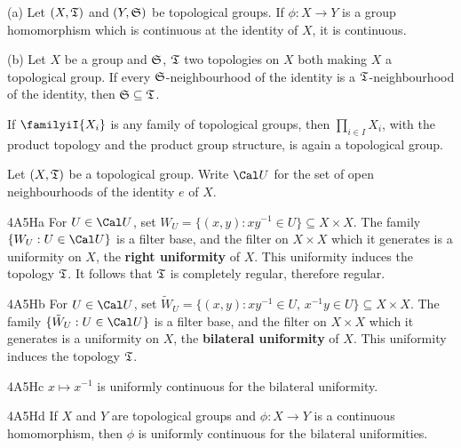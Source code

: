  (a) Let $(X,\frak T)$ and $(Y,\frak S)$ be
topological groups.   If $\phi:X\to Y$ is a group homomorphism which is
continuous at the identity of $X$, it is continuous.

(b) Let $X$ be a group and $\frak S$, $\frak T$ two topologies on $X$
both making $X$ a topological group.   If every $\frak S$-neighbourhood
of the identity is a $\frak T$-neighbourhood of the identity, then
$\frak S\subseteq\frak T$.  

 If $\familyiI{X_i}$ is any family of
topological groups, then $\prod_{i\in I}X_i$, with the product topology and
the product group structure, is again a topological group.

 Let $(X,\frak T)$
be a topological group.   Write $\Cal U$ for the set of open
neighbourhoods of the identity $e$ of $X$.

\spheader 4A5Ha For $U\in\Cal U$, set
$W_U=\{(x,y):xy^{-1}\in U\}\subseteq X\times X$.   The family
$\{W_U:U\in\Cal U\}$ is a filter base, and the filter on $X\times X$
which it generates is a uniformity on $X$, the {\bf right uniformity} of
$X$.
This uniformity induces the topology
$\frak T$.
It follows that $\frak T$ is completely regular, therefore
regular.

\spheader 4A5Hb For $U\in\Cal U$, set
$\tilde W_U=\{(x,y):xy^{-1}\in U,\,x^{-1}y\in U\}\subseteq X\times X$.
The family $\{\tilde W_U:U\in\Cal U\}$ is a filter base, and the filter
on $X\times X$ which it generates is a uniformity on $X$, the
{\bf bilateral uniformity}
of $X$.   This uniformity
induces the topology $\frak T$.   

\spheader 4A5Hc $x\mapsto x^{-1}$ is uniformly continuous for
the bilateral uniformity.   

\spheader 4A5Hd If $X$ and $Y$ are topological groups and
$\phi:X\to Y$ is a continuous homomorphism, then $\phi$ is uniformly
continuous for the bilateral uniformities.   

